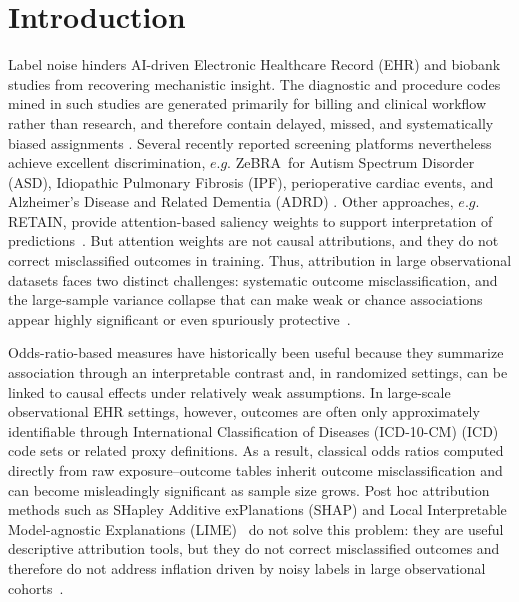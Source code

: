\documentclass[pdflatex,sn-mathphys-num]{sn-jnl}%
\def\zcor{ZeBRA\xspace}
\theoremstyle{thmstyleone}%
\theoremstyle{thmstyletwo}%
\theoremstyle{thmstylethree}%
\begin{document}
\section{Introduction}
Label noise hinders AI-driven Electronic Healthcare Record (EHR) and biobank studies from recovering mechanistic insight. The diagnostic and procedure codes mined in such studies are generated primarily for billing and clinical workflow rather than research, and therefore contain delayed, missed, and systematically biased assignments \cite{halpern2016electronic}. Several recently reported screening platforms nevertheless achieve excellent discrimination, $e.g.$ \zcor\ for Autism Spectrum Disorder (ASD), Idiopathic Pulmonary Fibrosis (IPF), perioperative cardiac events, and Alzheimer's Disease and Related Dementia (ADRD) \cite{ASDzed,IPFzed,JAHAzed,ADRDzed}. Other approaches, $e.g.$ RETAIN, provide attention-based saliency weights to support interpretation of predictions~\cite{choi2016retain}. But attention weights are not causal attributions, and they do not correct misclassified outcomes in training. Thus, attribution in large observational datasets faces two distinct challenges: systematic outcome misclassification, and the large-sample variance collapse that can make weak or chance associations appear highly significant or even spuriously protective~\cite{greenland1988sensitivity}.

Odds-ratio-based measures have historically been useful because they summarize association through an interpretable contrast and, in randomized settings, can be linked to causal effects under relatively weak assumptions. In large-scale observational EHR settings, however, outcomes are often only approximately identifiable through International Classification of Diseases (ICD-10-CM) (ICD) code sets or related proxy definitions. As a result, classical odds ratios computed directly from raw exposure--outcome tables inherit outcome misclassification and can become misleadingly significant as sample size grows. Post hoc attribution methods such as SHapley Additive exPlanations (SHAP) and Local Interpretable Model-agnostic Explanations (LIME)~\cite{lundberg17shap,Ribeiro2016WhyTrust} do not solve this problem: they are useful descriptive attribution tools, but they do not correct misclassified outcomes and therefore do not address inflation driven by noisy labels in large observational cohorts~\cite{slack2020fooling}.
\end{document}
